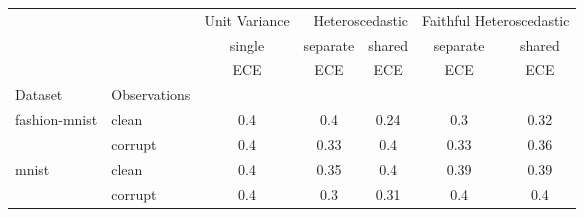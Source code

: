\begin{tabular}{ll|c|cc|cc}
\toprule
{} & {} & {Unit Variance} & \multicolumn{2}{r}{Heteroscedastic} & \multicolumn{2}{r}{Faithful Heteroscedastic} \\
{} & {} & {single} & {separate} & {shared} & {separate} & {shared} \\
{} & {} & {ECE} & {ECE} & {ECE} & {ECE} & {ECE} \\
{Dataset} & {Observations} & {} & {} & {} & {} & {} \\
\midrule
\multirow[c]{2}{*}{fashion-mnist} & clean & 0.4 & 0.4 & 0.24 & 0.3 & 0.32 \\
 & corrupt & 0.4 & 0.33 & 0.4 & 0.33 & 0.36 \\
\multirow[c]{2}{*}{mnist} & clean & 0.4 & 0.35 & 0.4 & 0.39 & 0.39 \\
 & corrupt & 0.4 & 0.3 & 0.31 & 0.4 & 0.4 \\
\bottomrule
\end{tabular}
